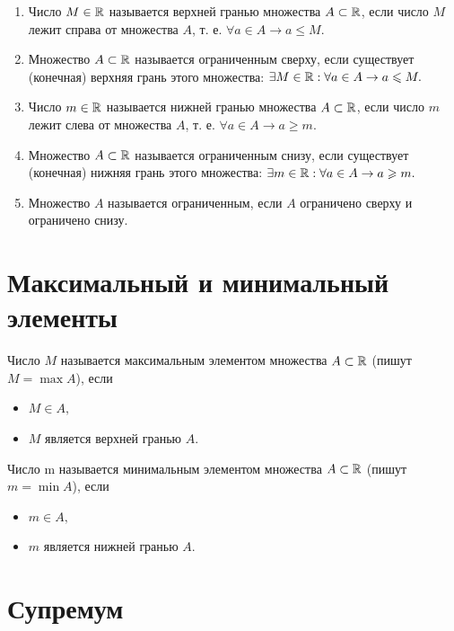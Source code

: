 	\begin{definition}	
		\begin{enumerate}
			\item Число $M \in \mathbb R$ называется верхней гранью множества $A \subset \mathbb R$, если число $M$ лежит справа от множества $A$, т. е. $\forall a \in A \rightarrow a \leqslant M.$
			\item Множество $A \subset \mathbb R$ называется ограниченным сверху, если существует (конечная) верхняя грань этого множества: $\exists M \in \mathbb R : \forall a \in A \rightarrow a \leqslant M.$
			\item Число $m \in \mathbb R$ называется нижней гранью множества $A \subset \mathbb R$, если число $m$ лежит слева от множества $A$, т. е. $\forall a \in A \rightarrow a \geqslant m.$
			\item Множество $A \subset \mathbb R$ называется ограниченным снизу, если существует (конечная) нижняя грань этого множества: $\exists m \in \mathbb R : \forall a \in A \rightarrow a \geqslant m.$
			\item Множество $A$ называется ограниченным, если $A$ ограничено сверху и ограничено снизу.
		\end{enumerate}
	\end{definition}
	
	\section{Максимальный и минимальный элементы}
	
	\begin{definition}
		Число $M$ называется максимальным элементом множества $A \subset \mathbb R$ (пишут $M = \max{A}$), если
		\begin{itemize}
			\item $M \in A,$
			\item $M$ является верхней гранью $A$.
		\end{itemize}
		Число m называется минимальным элементом множества $A \subset \mathbb R$ (пишут $m = \min{A}$), если
		\begin{itemize}
			\item $m \in A,$
			\item $m$ является нижней гранью $A$.
		\end{itemize}
	\end{definition}
	
	\section{Супремум}
	
